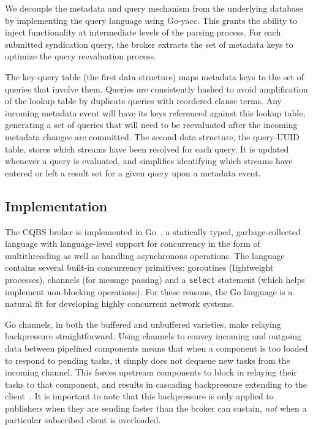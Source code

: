 We decouple the metadata and query mechanism from the underlying database by implementing the query language using Go-yacc.
This grants the ability to inject functionality at intermediate levels of the parsing process.
For each submitted syndication query, the broker extracts the set of metadata keys to optimize the query reevaluation process.

The key-query table (the first data structure) maps metadata keys to the set of queries that involve them.
Queries are consistently hashed to avoid amplification of the lookup table by duplicate queries with reordered clause terms.
Any incoming metadata event will have its keys referenced against this lookup table, generating a set of queries that will need to be reevaluated after the incoming metadata changes are committed.
The second data structure, the query-UUID table, stores which streams have been resolved for each query.
It is updated whenever a query is evaluated, and simplifies identifying which streams have entered or left a result set for a given query upon a metadata event.




\subsection{Implementation}

The CQBS broker is implemented in Go~\cite{go}, a statically typed, garbage-collected language with language-level support for concurrency in the
form of multithreading as well as handling asynchronous operations.
The language contains several built-in concurrency primitives: goroutines (lightweight processes), channels (for message passing) and a \texttt{select} statement (which helps implement non-blocking operations).
For these reasons, the Go language is a natural fit for developing highly concurrent network systems.

Go channels, in both the buffered and unbuffered varieties, make relaying backpressure straightforward.
Using channels to convey incoming and outgoing data between pipelined components means that when a component is too loaded to respond to pending tasks, it simply does not dequeue new tasks from the incoming channel.
This forces upstream components to block in relaying their tasks to that component, and results in cascading backpressure extending to the client~\cite{welsh2001seda}.
It is important to note that this backpressure is only applied to publishers when they are sending faster than the broker can sustain, \emph{not} when a particular subscribed client is overloaded.

